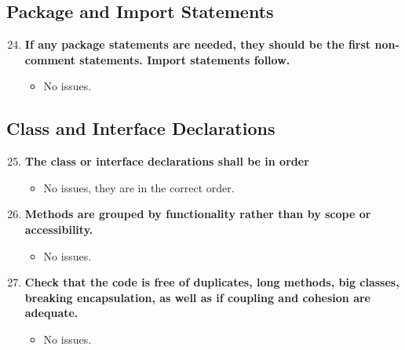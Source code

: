 \documentclass{article}
\begin{document}
		\subsection{Package and Import Statements}
			\begin{enumerate}
				\setcounter{enumi}{23}
				\item \textbf{If any package statements are needed, they should be the first non-comment statements. Import statements follow.}
				\begin{itemize}
					\item No issues.
				\end{itemize}
			\end{enumerate}
		\subsection{Class and Interface Declarations}
			\begin{enumerate}
				\setcounter{enumi}{24}
				\item \textbf{The class or interface declarations shall be in order}
				\begin{itemize}
					\item No issues, they are in the correct order.
				\end{itemize}
				\item \textbf{Methods are grouped by functionality rather than by scope or accessibility.}
				\begin{itemize}
					\item No issues.
				\end{itemize}
				\item \textbf{Check that the code is free of duplicates, long methods, big classes,	breaking encapsulation, as well as if coupling and cohesion are adequate.}
				\begin{itemize}
					\item No issues.
				\end{itemize}
			\end{enumerate}
\end{document}
